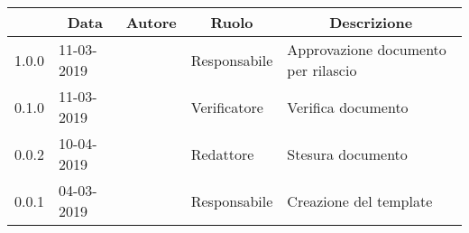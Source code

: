 \pagestyle{styleDocPages}

\begin{center} \sloppy
	\renewcommand{\arraystretch}{2.5}
	
	\begin{longtable}[H]{p{1.7cm} p{2cm} p{1.8cm} p{2.5cm} p{4cm}}
\rowcolor[HTML]{232f3e}
\multicolumn{1}{c}{\color[HTML]{FFFFFF} \textbf{Versione}} & 
\multicolumn{1}{c}{\color[HTML]{FFFFFF} \textbf{Data}} & 
\multicolumn{1}{c}{\color[HTML]{FFFFFF} \textbf{Autore}} & 
\multicolumn{1}{c}{\color[HTML]{FFFFFF} \textbf{Ruolo}} & 
\multicolumn{1}{c}{\color[HTML]{FFFFFF} \textbf{Descrizione}} \\
\endhead

1.0.0 & 11-03-2019 & \andrea{} & Responsabile & Approvazione documento per rilascio\\
0.1.0 & 11-03-2019 & \giacomo{} & Verificatore & Verifica documento\\
0.0.2 & 10-04-2019 & \valentin{} & Redattore & Stesura documento\\
0.0.1 & 04-03-2019 & \andrea{} & Responsabile & Creazione del template\\

\end{longtable}
\end{center}
